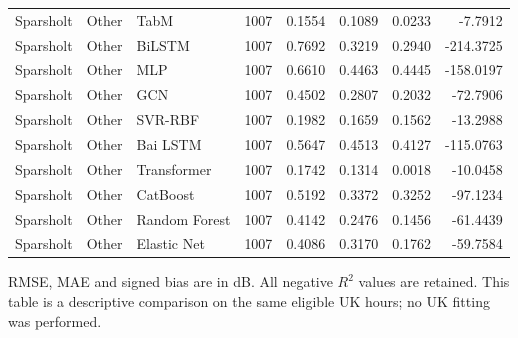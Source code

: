 \begin{longtable}{lllrrrrr}
\midrule
Sparsholt & Other & TabM & 1007 & 0.1554 & 0.1089 & 0.0233 & -7.7912 \\
Sparsholt & Other & BiLSTM & 1007 & 0.7692 & 0.3219 & 0.2940 & -214.3725 \\
Sparsholt & Other & MLP & 1007 & 0.6610 & 0.4463 & 0.4445 & -158.0197 \\
Sparsholt & Other & GCN & 1007 & 0.4502 & 0.2807 & 0.2032 & -72.7906 \\
Sparsholt & Other & SVR-RBF & 1007 & 0.1982 & 0.1659 & 0.1562 & -13.2988 \\
Sparsholt & Other & Bai LSTM & 1007 & 0.5647 & 0.4513 & 0.4127 & -115.0763 \\
Sparsholt & Other & Transformer & 1007 & 0.1742 & 0.1314 & 0.0018 & -10.0458 \\
Sparsholt & Other & CatBoost & 1007 & 0.5192 & 0.3372 & 0.3252 & -97.1234 \\
Sparsholt & Other & Random Forest & 1007 & 0.4142 & 0.2476 & 0.1456 & -61.4439 \\
Sparsholt & Other & Elastic Net & 1007 & 0.4086 & 0.3170 & 0.1762 & -59.7584 \\
\midrule
\bottomrule
\end{longtable}
\footnotesize RMSE, MAE and signed bias are in dB. All negative $R^2$ values are retained. This table is a descriptive comparison on the same eligible UK hours; no UK fitting was performed.
\endgroup